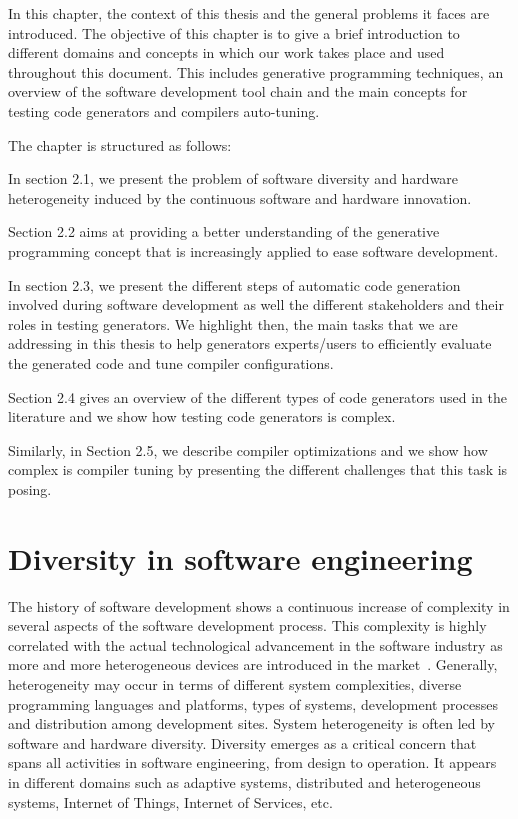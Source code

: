  
In this chapter, the context of this thesis and the general problems it faces are introduced. The objective of this chapter is to give a brief introduction to  different domains and concepts in which our work takes place and used throughout this document.
This includes generative programming techniques, an overview of the software development tool chain and the main concepts for testing code generators and compilers auto-tuning.


The chapter is structured as follows: 

In section 2.1, we present the problem of software diversity and hardware heterogeneity induced by the continuous software and hardware innovation. 

Section 2.2 aims at providing a better understanding of the generative programming concept that is increasingly applied to ease software development. 

In section 2.3, we present the different steps of automatic code generation involved during software development as well the different stakeholders and their roles in testing generators. We highlight then, the main tasks that we are addressing in this thesis to help generators experts/users to efficiently evaluate the generated code and tune compiler configurations.

Section 2.4 gives an overview of the different types of code generators used in the literature and we show how testing code generators is complex. 

Similarly, in Section 2.5, we describe compiler optimizations and we show how complex is compiler tuning by presenting the different challenges that this task is posing.


\section{Diversity in software engineering}
The history of software development shows a continuous increase of complexity in several aspects of the software development process. This complexity is highly correlated with the actual technological advancement in the software industry as more and more heterogeneous devices are introduced in the market~\cite{betz2011improving}. 
Generally, heterogeneity may occur in terms of different system complexities, diverse programming languages and platforms, types of systems, development processes and distribution among development sites\cite{ghazi2015heterogeneous}.
System heterogeneity is often led by software and hardware diversity.
Diversity emerges as a critical concern that spans all activities in software engineering, from design to operation\cite{acher2014software}. It appears in different domains such as adaptive systems, distributed and heterogeneous systems, Internet of Things, Internet of Services, etc.

